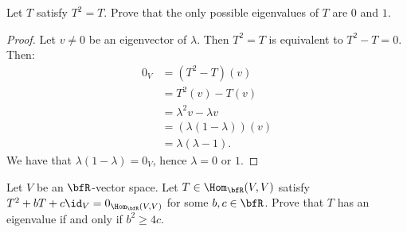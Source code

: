 \documentclass[10pt,twoside,openany]{memoir}
\begin{document}
        \begin{exercise}
            Let $T$ satisfy $T^2 = T$. Prove that the only possible eigenvalues of $T$ are $0$ and $1$.
        \end{exercise}
            \begin{proof}
                Let $v\neq 0$ be an eigenvector of $\lambda$. Then $T^2 = T$ is equivalent to $T^2 - T = 0$. Then:
                    \begin{equation*}
                    \begin{split}
                        0_V 
                        & = (T^2 - T)(v) \\
                        & = T^2(v) - T(v) \\
                        & = \lambda^2v - \lambda v \\
                        & = (\lambda(1 - \lambda))(v) \\
                        & = \lambda(\lambda - 1).
                    \end{split}
                    \end{equation*}
                We have that $\lambda(1-\lambda) = 0_V$, hence $\lambda = 0$ or $1$.
            \end{proof}
    \begin{exercise}
        Let $V$ be an $\bfR$-vector space. Let $T \in \Hom_\bfR(V,V)$ satisfy $T^2 + bT + c\id_V = 0_{\Hom_\bfR(V,V)}$ for some $b,c \in \bfR$. Prove that $T$ has an eigenvalue if and only if $b^2 \geq 4c$.
    \end{exercise}
\end{document}

